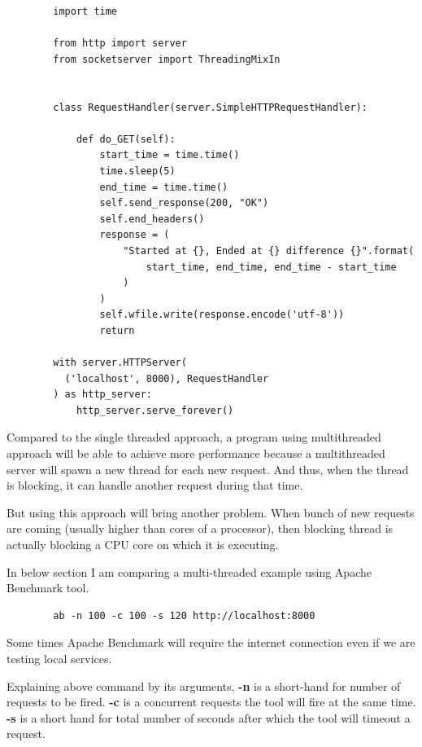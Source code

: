 \documentclass{article}
\begin{document}
      \begin{verbatim}
        import time

        from http import server
        from socketserver import ThreadingMixIn


        class RequestHandler(server.SimpleHTTPRequestHandler):

            def do_GET(self):
                start_time = time.time()
                time.sleep(5)
                end_time = time.time()
                self.send_response(200, "OK")
                self.end_headers()
                response = (
                    "Started at {}, Ended at {} difference {}".format(
                        start_time, end_time, end_time - start_time
                    )
                )
                self.wfile.write(response.encode('utf-8'))
                return

        with server.HTTPServer(
          ('localhost', 8000), RequestHandler
        ) as http_server:
            http_server.serve_forever()
      \end{verbatim}

      Compared to the single threaded approach, a program using  multithreaded
      approach will be able to achieve more performance because a multithreaded
      server will spawn a new thread for each new request. And thus, when the
      thread is blocking, it can handle another request during that time.

      But using this approach will bring another problem. When bunch of new
      requests are coming (usually higher than cores of a processor), then
      blocking thread is actually blocking a CPU core on which it is executing.

      In below section I am comparing a multi-threaded example using Apache
      Benchmark tool.

      \begin{verbatim}
        ab -n 100 -c 100 -s 120 http://localhost:8000
      \end{verbatim}

      Some times Apache Benchmark will require the internet connection even if
      we are testing local services.

      Explaining above command by its arguments, \textbf{-n} is a short-hand
      for number of requests to be fired. \textbf{-c} is a concurrent requests
      the tool will fire at the same time. \textbf{-s} is a short hand for
      total number of seconds after which the tool will timeout a request.
\end{document}
